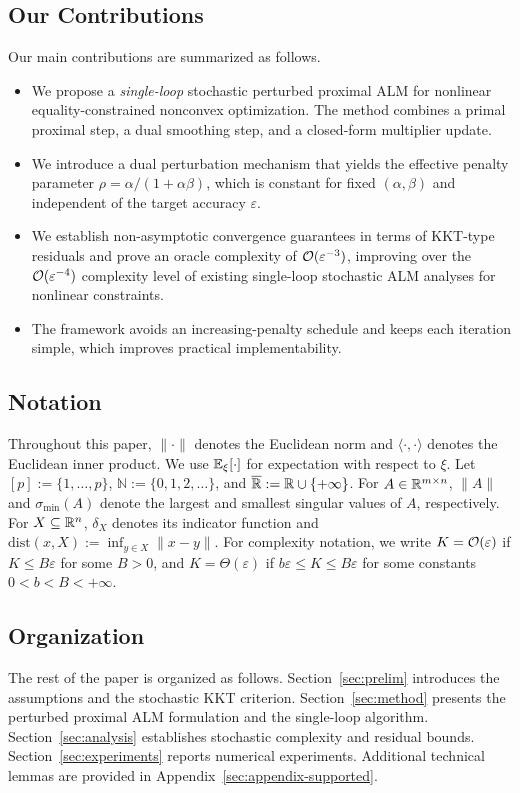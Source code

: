 \documentclass[10pt]{article}
\begin{document}
\subsection{Our Contributions}
Our main contributions are summarized as follows.
\begin{itemize}
    \item We propose a \emph{single-loop} stochastic perturbed proximal ALM for nonlinear equality-constrained nonconvex optimization. The method combines a primal proximal step, a dual smoothing step, and a closed-form multiplier update.
    \item We introduce a dual perturbation mechanism that yields the effective penalty parameter
    \(
    \rho = \alpha/(1+\alpha\beta)
    \),
    which is constant for fixed \((\alpha,\beta)\) and independent of the target accuracy \(\varepsilon\).
    \item We establish non-asymptotic convergence guarantees in terms of KKT-type residuals and prove an oracle complexity of \(\mathcal{O}(\varepsilon^{-3})\), improving over the \(\mathcal{O}(\varepsilon^{-4})\) complexity level of existing single-loop stochastic ALM analyses for nonlinear constraints.
    \item The framework avoids an increasing-penalty schedule and keeps each iteration simple, which improves practical implementability.
\end{itemize}

\subsection{Notation}
Throughout this paper, $\|\cdot\|$ denotes the Euclidean norm and $\langle\cdot,\cdot\rangle$ denotes the Euclidean inner product. We use $\mathbb{E}_{\xi}[\cdot]$ for expectation with respect to $\xi$. Let $[p]:=\{1,\ldots,p\}$, $\mathbb{N}:=\{0,1,2,\ldots\}$, and $\overline{\mathbb{R}}:=\mathbb{R}\cup\{+\infty\}$. For $A\in\mathbb{R}^{m\times n}$, $\|A\|$ and $\sigma_{\min}(A)$ denote the largest and smallest singular values of $A$, respectively. For $X\subseteq\mathbb{R}^n$, $\delta_X$ denotes its indicator function and $\mathrm{dist}(x,X):=\inf_{y\in X}\|x-y\|$. For complexity notation, we write $K=\mathcal{O}(\varepsilon)$ if $K\leq B\varepsilon$ for some $B>0$, and $K=\Theta(\varepsilon)$ if $b\varepsilon\leq K\leq B\varepsilon$ for some constants $0<b<B<+\infty$.
\subsection{Organization}
The rest of the paper is organized as follows. Section~\ref{sec:prelim} introduces the assumptions and the stochastic KKT criterion. Section~\ref{sec:method} presents the perturbed proximal ALM formulation and the single-loop algorithm. Section~\ref{sec:analysis} establishes stochastic complexity and residual bounds. Section~\ref{sec:experiments} reports numerical experiments. Additional technical lemmas are provided in Appendix~\ref{sec:appendix-supported}.
\end{document}
